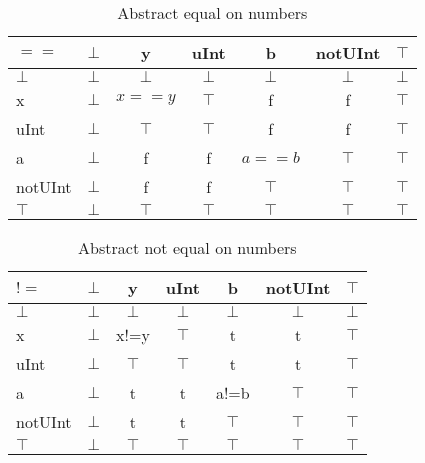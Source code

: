 \begin{table}[htbp]
\centering
\begin{tabular}{l|cccccc}
$==$    & $\bot$ & y      & uInt   & b      & notUInt & $\top$ \\\hline
$\bot$  & $\bot$ & $\bot$ & $\bot$ & $\bot$ & $\bot$  & $\bot$ \\
x       & $\bot$ & $x==y$ & $\top$ & f      & f       & $\top$ \\
uInt    & $\bot$ & $\top$ & $\top$ & f      & f       & $\top$ \\
a       & $\bot$ & f      & f      & $a==b$ & $\top$  & $\top$ \\
notUInt & $\bot$ & f      & f      & $\top$ & $\top$  & $\top$ \\
$\top$  & $\bot$ & $\top$ & $\top$ & $\top$ & $\top$  & $\top$
\end{tabular}
\caption{Abstract equal on numbers}
\label{tab:abstract_equal_number}
\end{table}

\begin{table}[htbp]
\centering
\begin{tabular}{l|cccccc}
$!=$    & $\bot$ & y      & uInt   & b      & notUInt & $\top$ \\\hline
$\bot$  & $\bot$ & $\bot$ & $\bot$ & $\bot$ & $\bot$  & $\bot$ \\
x       & $\bot$ & x!=y   & $\top$ & t      & t       & $\top$ \\
uInt    & $\bot$ & $\top$ & $\top$ & t      & t       & $\top$ \\
a       & $\bot$ & t      & t      & a!=b   & $\top$  & $\top$ \\
notUInt & $\bot$ & t      & t      & $\top$ & $\top$  & $\top$ \\
$\top$  & $\bot$ & $\top$ & $\top$ & $\top$ & $\top$  & $\top$
\end{tabular}
\caption{Abstract not equal on numbers}
\label{tab:abstract_not_equal_number}
\end{table}

